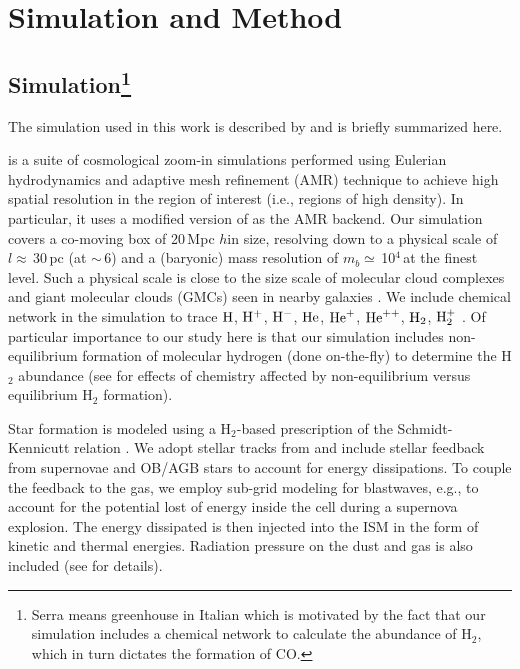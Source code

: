 \IfFileExists{emulateapjlegacy.cls}{\documentclass[iop]{emulateapjlegacy}}{\documentclass[iop]{emulateapj}}
\begin{document}
\section{Simulation and Method} \label{sec:sim}


\subsection{ Simulation\footnote{Serra means greenhouse in Italian which is motivated by the
fact that our simulation includes a chemical network to calculate the abundance of H$_2$, which in turn
dictates the formation of CO.
}}
The simulation used in this work is described by \citealt{Pallottini17a, Pallottini17b} and is briefly summarized here.

 is a suite of cosmological zoom-in simulations performed using Eulerian hydrodynamics and
adaptive mesh refinement (AMR) technique to achieve high spatial resolution in the region of interest (i.e., regions of high density).
In particular, it uses a modified version of  \citep{Teyssier2002a} as the AMR backend.
Our simulation covers a co-moving box of 20\,Mpc $h$\pmOne in size, resolving down to a physical scale of $l\approx$\,30\,pc (at \z$\sim$\,6) and a (baryonic) mass resolution of $m_b\simeq$\,10$^4$\,\Msun at the finest level. Such a physical scale is close to the size scale of molecular cloud complexes and giant molecular clouds (GMCs) seen in nearby galaxies \citep[e.g.,][]{Sanders85a, Federrath13a, Goodman14a}.
We include chemical network in the simulation to trace $\rm{H}$, $\rm{H}^{+}$, $\rm{H}^{-}$, $\rm{He}$, $\rm{He}^{+}$, $\rm{He}^{++}$, $\rm{H}_2$, $\rm{H}_2^{+}$ \citep{Grassi14a,Bovino16a}.
Of particular importance to our study here is that our simulation includes non-equilibrium formation of molecular hydrogen (done on-the-fly) to determine the H$_2$ abundance (see \citealt{Pallottini17b} for effects of chemistry affected by non-equilibrium versus equilibrium H$_2$ formation).

Star formation is modeled using a H$_2$-based prescription of the Schmidt-Kennicutt relation \citep{Krumholz09a}. We adopt stellar tracks from  and include stellar feedback from supernovae and OB/AGB stars to account for energy dissipations. To couple the feedback to the gas, we employ sub-grid modeling for blastwaves, e.g., to account for the potential lost of energy inside the cell during a supernova explosion. The energy dissipated is then injected into the ISM in the form of kinetic and thermal energies. Radiation pressure on the dust and gas is also included (see \citealt{Pallottini17a} for details).
\end{document}
